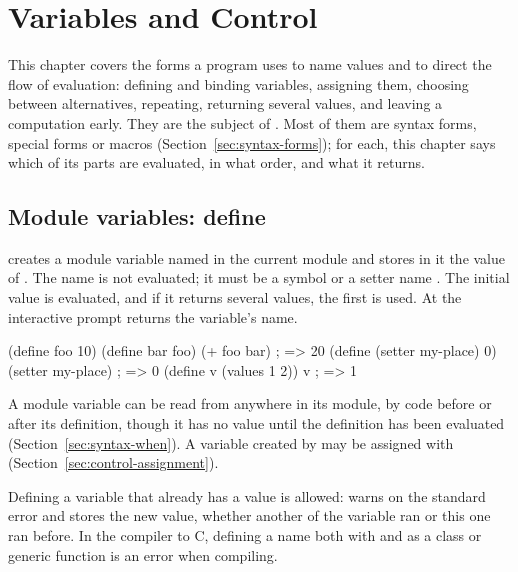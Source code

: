 \chapter{Variables and Control}\label{ch:control}

This chapter covers the forms a program uses to name values and to direct
the flow of evaluation: defining and binding variables, assigning them,
choosing between alternatives, repeating, returning several values, and
leaving a computation early. They are the subject of
. Most of them are syntax forms, special
forms or macros (Section~\ref{sec:syntax-forms}); for each, this chapter says which
of its parts are evaluated, in what order, and what it returns.

\section{Module variables: define}\label{sec:control-define}

\begin{quote}
\end{quote}

\noindent {} creates a module variable named
 in the current module and stores in it the value of
. The name is not evaluated; it must be a symbol or a
setter name . The initial value is evaluated,
and if it returns several values, the first is used. At the interactive
prompt  returns the variable's name.

\begin{dylan}
(define foo 10)
(define bar foo)
(+ foo bar)               ; => 20
(define (setter my-place) 0)
(setter my-place)         ; => 0
(define v (values 1 2))
v                         ; => 1
\end{dylan}

\noindent A module variable can be read from anywhere in its module, by
code before or after its definition, though it has no value until the
definition has been evaluated (Section~\ref{sec:syntax-when}). A variable created by
 may be assigned with 
(Section~\ref{sec:control-assignment}).

Defining a variable that already has a value is allowed: 
warns  on the standard error and stores the new
value, whether another  of the variable ran or this one ran
before. In the compiler to C, defining a name both with  and
as a class or generic function is an error when compiling.

